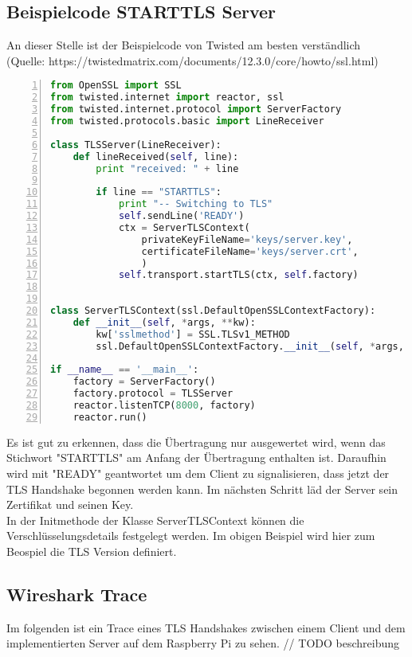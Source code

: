 \subsection{Beispielcode STARTTLS Server}
An dieser Stelle ist der Beispielcode von Twisted am besten verständlich\\
(Quelle: https://twistedmatrix.com/documents/12.3.0/core/howto/ssl.html)\\
\begin{lstlisting}[caption =Testcode Echoserver mit Twisted Framework, language=python, frame=single, breaklines=true,columns=fullflexible, commentstyle=\color{gray}\upshape, captionpos=b, numbers = left]
from OpenSSL import SSL
from twisted.internet import reactor, ssl
from twisted.internet.protocol import ServerFactory
from twisted.protocols.basic import LineReceiver

class TLSServer(LineReceiver):
    def lineReceived(self, line):
        print "received: " + line

        if line == "STARTTLS":
            print "-- Switching to TLS"
            self.sendLine('READY')
            ctx = ServerTLSContext(
                privateKeyFileName='keys/server.key',
                certificateFileName='keys/server.crt',
                )
            self.transport.startTLS(ctx, self.factory)


class ServerTLSContext(ssl.DefaultOpenSSLContextFactory):
    def __init__(self, *args, **kw):
        kw['sslmethod'] = SSL.TLSv1_METHOD
        ssl.DefaultOpenSSLContextFactory.__init__(self, *args, **kw)

if __name__ == '__main__':
    factory = ServerFactory()
    factory.protocol = TLSServer
    reactor.listenTCP(8000, factory)
    reactor.run()
\end{lstlisting}
Es ist gut zu erkennen, dass die Übertragung nur ausgewertet wird, wenn das Stichwort "STARTTLS" am Anfang der Übertragung enthalten ist. Daraufhin wird mit "READY" geantwortet um dem Client zu signalisieren, dass jetzt der TLS Handshake begonnen werden kann. Im nächsten Schritt läd der Server sein Zertifikat und seinen Key. \\
In der Initmethode der Klasse ServerTLSContext können die Verschlüsselungsdetails festgelegt werden. Im obigen Beispiel wird hier zum Beospiel die TLS Version definiert.  \\

\subsection{Wireshark Trace}
Im folgenden ist ein Trace eines TLS Handshakes zwischen einem Client und dem implementierten Server auf dem Raspberry Pi zu sehen. // TODO beschreibung
